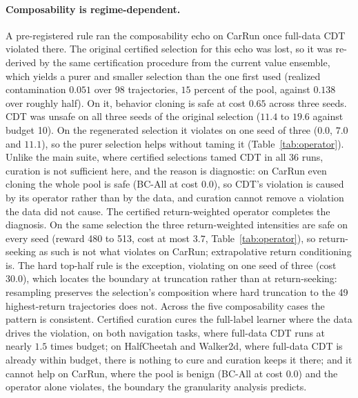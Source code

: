 \documentclass{article} %
\begin{document}
\paragraph{Composability is regime-dependent.} A pre-registered rule ran the composability echo on CarRun once full-data CDT violated there. The original certified selection for this echo was lost, so it was re-derived by the same certification procedure from the current value ensemble, which yields a purer and smaller selection than the one first used (realized contamination $0.051$ over 98 trajectories, $15$ percent of the pool, against $0.138$ over roughly half). On it, behavior cloning is safe at cost $0.65$ across three seeds. CDT was unsafe on all three seeds of the original selection ($11.4$ to $19.6$ against budget 10). On the regenerated selection it violates on one seed of three ($0.0$, $7.0$ and $11.1$), so the purer selection helps without taming it (Table~\ref{tab:operator}). Unlike the main suite, where certified selections tamed CDT in all 36 runs, curation is not sufficient here, and the reason is diagnostic: on CarRun even cloning the whole pool is safe (BC-All at cost $0.0$), so CDT's violation is caused by its operator rather than by the data, and curation cannot remove a violation the data did not cause. The certified return-weighted operator completes the diagnosis. On the same selection the three return-weighted intensities are safe on every seed (reward 480 to 513, cost at most $3.7$, Table~\ref{tab:operator}), so return-seeking as such is not what violates on CarRun; extrapolative return conditioning is. The hard top-half rule is the exception, violating on one seed of three (cost 30.0), which locates the boundary at truncation rather than at return-seeking: resampling preserves the selection's composition where hard truncation to the 49 highest-return trajectories does not. Across the five composability cases the pattern is consistent. Certified curation cures the full-label learner where the data drives the violation, on both
navigation tasks, where full-data CDT runs at nearly $1.5$ times budget; on HalfCheetah and Walker2d, where
full-data CDT is already within budget, there is nothing to cure and curation keeps it there; and it cannot help
on CarRun, where the pool is benign (BC-All at cost $0.0$) and the operator alone violates, the
boundary the granularity analysis predicts.
\end{document}
